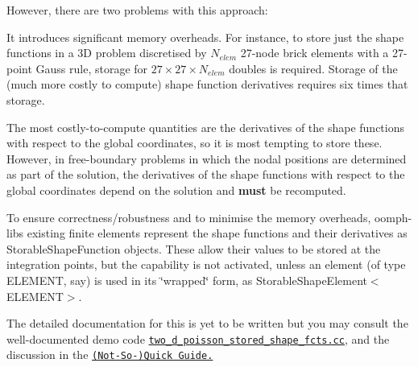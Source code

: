 However, there are two problems with this approach\+:
\begin{DoxyEnumerate}
\item It introduces significant memory overheads. For instance, to store just the shape functions in a 3D problem discretised by $ N_{elem}$ 27-\/node brick elements with a 27-\/point Gauss rule, storage for $ 27 \times 27 \times N_{elem} $ doubles is required. Storage of the (much more costly to compute) shape function derivatives requires six times that storage.
\item The most costly-\/to-\/compute quantities are the derivatives of the shape functions with respect to the global coordinates, so it is most tempting to store these. However, in free-\/boundary problems in which the nodal positions are determined as part of the solution, the derivatives of the shape functions with respect to the global coordinates depend on the solution and {\bfseries must} be recomputed.
\end{DoxyEnumerate}To ensure correctness/robustness and to minimise the memory overheads, {\ttfamily oomph-\/lib\textquotesingle{}s} existing finite elements represent the shape functions and their derivatives as {\ttfamily Storable\+Shape\+Function} objects. These allow their values to be stored at the integration points, but the capability is not activated, unless an element (of type {\ttfamily E\+L\+E\+M\+E\+NT}, say) is used in its \char`\"{}wrapped\char`\"{} form, as {\ttfamily Storable\+Shape\+Element$<$\+E\+L\+E\+M\+E\+N\+T$>$}.

The detailed documentation for this is yet to be written but you may consult the well-\/documented demo code \href{../../../demo_drivers/optimisation/stored_shape_fcts/two_d_poisson_stored_shape_fcts.cc}{\tt two\+\_\+d\+\_\+poisson\+\_\+stored\+\_\+shape\+\_\+fcts.\+cc}, and the discussion in the \href{../../quick_guide/html/index.html#pre_compute_psi}{\tt (Not-\/\+So-\/)Quick Guide.}



 

